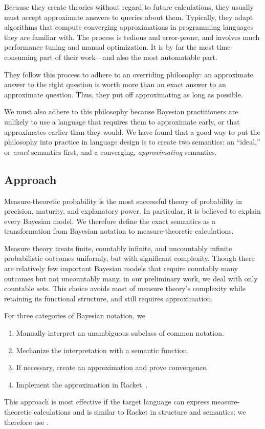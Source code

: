 Because they create theories without regard to future calculations, they usually must accept approximate answers to queries about them. Typically, they adapt algorithms that compute converging approximations in programming languages they are familiar with. The process is tedious and error-prone, and involves much performance tuning and manual optimization. It is by far the most time-consuming part of their work---and also the most automatable part.

They follow this process to adhere to an overriding philosophy: an approximate answer to the right question is worth more than an exact answer to an approximate question. Thus, they put off approximating as long as possible.

We must also adhere to this philosophy because Bayesian practitioners are unlikely to use a language that requires them to approximate early, or that approximates earlier than they would. We have found that a good way to put the philosophy into practice in language design is to create two semantics: an ``ideal,'' or \textit{exact} semantics first, and a converging, \textit{approximating} semantics.

\subsection{Approach}

Measure-theoretic probability is the most successful theory of probability in precision, maturity, and explanatory power. In particular, it is believed to explain every Bayesian model. We therefore define the exact semantics as a transformation from Bayesian notation to measure-theoretic calculations.

Measure theory treats finite, countably infinite, and uncountably infinite probabilistic outcomes uniformly, but with significant complexity. Though there are relatively few important Bayesian models that require countably many outcomes but not uncountably many, in our preliminary work, we deal with only countable sets. This choice avoids most of measure theory's complexity while retaining its functional structure, and still requires approximation.

For three categories of Bayesian notation, we
\begin{enumerate}
	\item Manually interpret an unambiguous subclass of common notation.
	\item Mechanize the interpretation with a semantic function.
	\item If necessary, create an approximation and prove convergence.
	\item Implement the approximation in Racket~\cite{cit:racket-lang}.
\end{enumerate}
This approach is most effective if the target language can express measure-theoretic calculations and is similar to Racket in structure and semantics; we therefore use \targetlang.

